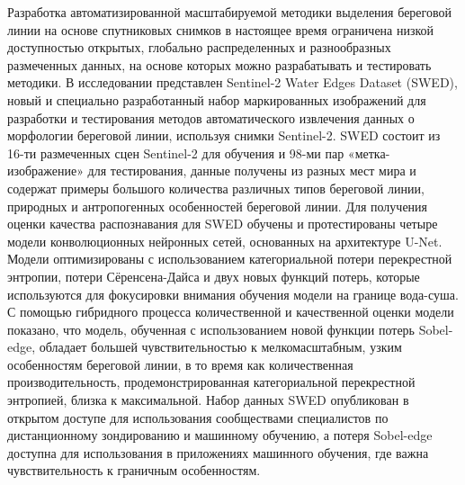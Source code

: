 \documentclass[732,fontsize=14pt,final]{studrep}
\begin{document}
Разработка автоматизированной масштабируемой методики выделения береговой линии на основе спутниковых снимков в настоящее время ограничена низкой доступностью открытых, глобально распределенных и разнообразных размеченных данных, на основе которых можно разрабатывать и тестировать методики. В исследовании \cite{b2} представлен Sentinel-2 Water Edges Dataset (SWED), новый и специально разработанный набор маркированных изображений для разработки и тестирования методов автоматического извлечения данных о морфологии береговой линии, используя снимки Sentinel-2. SWED состоит из 16-ти размеченных сцен Sentinel-2 для обучения и 98-ми пар «метка-изображение» для тестирования, данные получены из разных мест мира и содержат примеры большого количества различных типов береговой линии, природных и антропогенных особенностей береговой линии. Для получения оценки качества распознавания для SWED обучены и протестированы четыре модели конволюционных нейронных сетей, основанных на архитектуре U-Net. Модели оптимизированы с использованием категориальной потери перекрестной энтропии, потери Сёренсена-Дайса и двух новых функций потерь, которые используются для фокусировки внимания обучения модели на границе вода-суша. С помощью гибридного процесса количественной и качественной оценки модели показано, что модель, обученная с использованием новой функции потерь Sobel-edge, обладает большей чувствительностью к мелкомасштабным, узким особенностям береговой линии, в то время как количественная производительность, продемонстрированная категориальной перекрестной энтропией, близка к максимальной. Набор данных SWED опубликован в открытом доступе для использования сообществами специалистов по дистанционному зондированию и машинному обучению, а потеря Sobel-edge доступна для использования в приложениях машинного обучения, где важна чувствительность к граничным особенностям.
\end{document}

